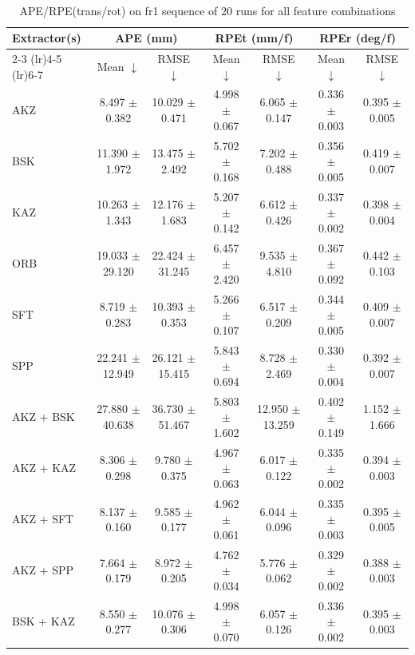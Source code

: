 \begin{table}[hbp]
\centering
\caption{APE/RPE(trans/rot) on fr1 sequence of 20 runs for all feature combinations}
\scriptsize
\label{tab:fr1_ape_rpe}\
\setlength{\tabcolsep}{3pt}
\begin{tabular}{lcccccc}
\toprule
\textbf{Extractor(s)}
& \multicolumn{2}{c}{\textbf{APE (mm)}}
& \multicolumn{2}{c}{\textbf{RPEt (mm/f)}}
& \multicolumn{2}{c}{\textbf{RPEr (deg/f)}} \\
\cmidrule(lr){2-3} \cmidrule(lr){4-5} \cmidrule(lr){6-7}
& Mean $\downarrow$ & RMSE $\downarrow$
& Mean $\downarrow$ & RMSE $\downarrow$
& Mean $\downarrow$ & RMSE $\downarrow$ \\
\midrule
AKZ & 8.497 $\pm$ 0.382 & 10.029 $\pm$ 0.471 & 4.998 $\pm$ 0.067 & 6.065 $\pm$ 0.147 & 0.336 $\pm$ 0.003 & 0.395 $\pm$ 0.005 \\
BSK & 11.390 $\pm$ 1.972 & 13.475 $\pm$ 2.492 & 5.702 $\pm$ 0.168 & 7.202 $\pm$ 0.488 & 0.356 $\pm$ 0.005 & 0.419 $\pm$ 0.007 \\
KAZ & 10.263 $\pm$ 1.343 & 12.176 $\pm$ 1.683 & 5.207 $\pm$ 0.142 & 6.612 $\pm$ 0.426 & 0.337 $\pm$ 0.002 & 0.398 $\pm$ 0.004 \\
ORB & 19.033 $\pm$ 29.120 & 22.424 $\pm$ 31.245 & 6.457 $\pm$ 2.420 & 9.535 $\pm$ 4.810 & 0.367 $\pm$ 0.092 & 0.442 $\pm$ 0.103 \\
SFT & 8.719 $\pm$ 0.283 & 10.393 $\pm$ 0.353 & 5.266 $\pm$ 0.107 & 6.517 $\pm$ 0.209 & 0.344 $\pm$ 0.005 & 0.409 $\pm$ 0.007 \\
SPP & 22.241 $\pm$ 12.949 & 26.121 $\pm$ 15.415 & 5.843 $\pm$ 0.694 & 8.728 $\pm$ 2.469 & 0.330 $\pm$ 0.004 & 0.392 $\pm$ 0.007 \\
AKZ + BSK & 27.880 $\pm$ 40.638 & 36.730 $\pm$ 51.467 & 5.803 $\pm$ 1.602 & 12.950 $\pm$ 13.259 & 0.402 $\pm$ 0.149 & 1.152 $\pm$ 1.666 \\
AKZ + KAZ & 8.306 $\pm$ 0.298 & 9.780 $\pm$ 0.375 & 4.967 $\pm$ 0.063 & 6.017 $\pm$ 0.122 & 0.335 $\pm$ 0.002 & 0.394 $\pm$ 0.003 \\
AKZ + SFT & 8.137 $\pm$ 0.160 & 9.585 $\pm$ 0.177 & 4.962 $\pm$ 0.061 & 6.044 $\pm$ 0.096 & 0.335 $\pm$ 0.003 & 0.395 $\pm$ 0.005 \\
AKZ + SPP & 7.664 $\pm$ 0.179 & 8.972 $\pm$ 0.205 & 4.762 $\pm$ 0.034 & 5.776 $\pm$ 0.062 & 0.329 $\pm$ 0.002 & 0.388 $\pm$ 0.003 \\
BSK + KAZ & 8.550 $\pm$ 0.277 & 10.076 $\pm$ 0.306 & 4.998 $\pm$ 0.070 & 6.057 $\pm$ 0.126 & 0.336 $\pm$ 0.002 & 0.395 $\pm$ 0.003 \\

\end{tabular}
\end{table}
